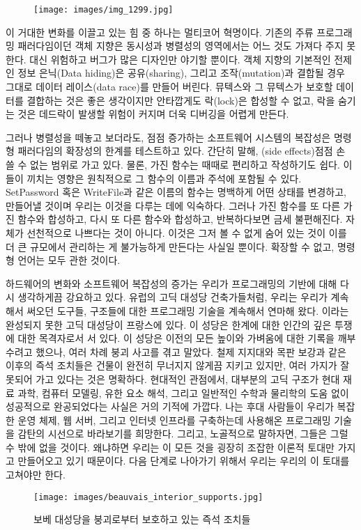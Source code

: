 \begin{figure}[H]
\centering
\texttt{[image: images/img\_1299.jpg]}
\end{figure}

\noindent
이 거대한 변화를 이끌고 있는 힘 중 하나는 멀티코어 혁명이다.
기존의 주류 프로그래밍 패러다임이던 객체 지향은 동시성과 병렬성의 영역에서는 어느 것도 가져다 주지 못 한다.
대신 위험하고 버그가 많은 디자인만 야기할 뿐이다.
객체 지향의 기본적인 전제인 정보 은닉(Data hiding)은 공유(sharing), 그리고 조작(mutation)과 결합될 경우 그대로 데이터 레이스(data race)를 만들어 버린다.
뮤텍스와 그 뮤텍스가 보호할 데이터를 결합하는 것은 좋은 생각이지만 안타깝게도 락(lock)은 합성할 수 없고, 락을 숨기는 것은 데드락이 발생할 위험이 커지며 더욱 디버깅을 어렵게 만든다.

그러나 병렬성을 떼놓고 보더라도, 점점 증가하는 소프트웨어 시스템의 복잡성은 명령형 패러다임의 확장성의 한계를 테스트하고 있다.
간단히 말해, \trSideEffect(side effects)\은 점점 손 쓸 수 없는 범위로 가고 있다. 물론, \trSideEffect\을 가진 함수는 때때로 편리하고 작성하기도 쉽다.
이들이 끼치는 영향은 원칙적으로 그 함수의 이름과 주석에 포함될 수 있다.
SetPassword 혹은 WriteFile과 같은 이름의 함수는 명백하게 어떤 상태를 변경하고, \trSideEffect\을 만들어낼 것이며 우리는 이것을 다루는 데에 익숙하다.
그러나 \trSideEffect\을 가진 함수를 또 다른 \trSideEffect\을 가진 함수와 합성하고, 다시 또 다른 함수와 합성하고, 반복하다보면 금세 불편해진다. 
\trSideEffect 자체가 선천적으로 나쁘다는 것이 아니다. 이것은 그저 \trSideEffect\이 볼 수 없게 숨어 있는 것이 이를 더 큰 규모에서 관리하는 게 불가능하게 만든다는 사실일 뿐이다.
\trSideEffect\은 확장할 수 없고, 명령형 언어는 모두  관한 것이다.

하드웨어의 변화와 소프트웨어 복잡성의 증가는 우리가 프로그래밍의 기반에 대해 다시 생각하게끔 강요하고 있다.
유럽의 고딕 대성당 건축가들처럼, 우리는 우리가 계속해서 써오던 도구들, 구조들에 대한 프로그래밍 기술을 계속해서 연마해 왔다.
이라는 완성되지 못한 고딕 대성당이 프랑스에 있다.
이 성당은 한계에 대한 인간의 깊은 투쟁에 대한 목격자로서 서 있다.
이 성당은 이전의 모든 높이와 가벼움에 대한 기록을 깨부수려고 했으나, 여러 차례 붕괴 사고를 겪고 말았다.
철제 지지대와 목판 보강과 같은 이후의 즉석 조치들은 건물이 완전히 무너지지 않게끔 지키고 있지만, 여러 가지가 잘못되어 가고 있다는 것은 명확하다.
현대적인 관점에서, 대부분의 고딕 구조가 현대 재료 과학, 컴퓨터 모델링, 유한 요소 해석, 그리고 일반적인 수학과 물리학의 도움 없이 성공적으로 완공되었다는 사실은 거의 기적에 가깝다.
나는 후대 사람들이 우리가 복잡한 운영 체제, 웹 서버, 그리고 인터넷 인프라를 구축하는데 사용해온 프로그래밍 기술을 감탄의 시선으로 바라보기를 희망한다.
그리고, 노골적으로 말하자면, 그들은 그럴 수 밖에 없을 것이다. 왜냐하면 우리는 이 모든 것을 굉장히 조잡한 이론적 토대만 가지고 만들어오고 있기 때문이다.
다음 단계로 나아가기 위해서 우리는 우리의 이 토대를 고쳐야만 한다.

\begin{figure}
\centering
\texttt{[image: images/beauvais\_interior\_supports.jpg]}
\caption{보베 대성당을 붕괴로부터 보호하고 있는 즉석 조치들}
\end{figure}
